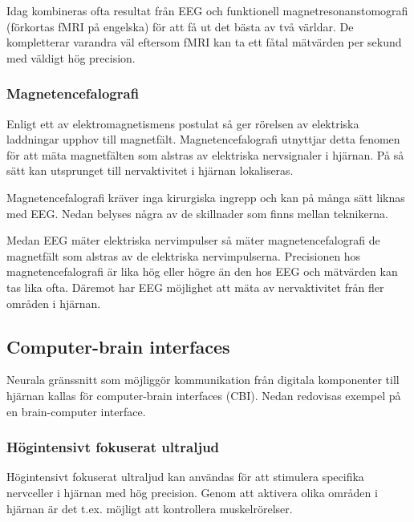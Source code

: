 \documentclass[12pt, a4paper]{article}
\begin{document}
Idag kombineras ofta resultat från EEG och funktionell magnetresonanstomografi
(förkortas fMRI på engelska) för att få ut det bästa av två världar. De
kompletterar varandra väl eftersom fMRI kan ta ett fåtal mätvärden per sekund
med väldigt hög precision. \cite{eeg_fmri}

\subsubsection{Magnetencefalografi}
\label{meg}

Enligt ett av elektromagnetismens postulat så ger rörelsen av elektriska
laddningar upphov till magnetfält. \cite{electromagnetism} Magnetencefalografi
utnyttjar detta fenomen för att mäta magnetfälten som alstras av elektriska
nervsignaler i hjärnan. På så sätt kan utsprunget till nervaktivitet i hjärnan
lokaliseras.

Magnetencefalografi kräver inga kirurgiska ingrepp och kan på många sätt liknas
med EEG. Nedan belyses några av de skillnader som finns mellan teknikerna.

Medan EEG mäter elektriska nervimpulser så mäter magnetencefalografi de
magnetfält som alstras av de elektriska nervimpulserna. Precisionen hos
magnetencefalografi är lika hög eller högre än den hos EEG och mätvärden kan tas
lika ofta. Däremot har EEG möjlighet att mäta av nervaktivitet från fler områden
i hjärnan. \cite{meg_eeg}

%
%

\subsection{Computer-brain interfaces}

Neurala gränssnitt som möjliggör kommunikation från digitala komponenter till
hjärnan kallas för computer-brain interfaces (CBI). Nedan redovisas exempel på
en brain-computer interface.

\subsubsection{Högintensivt fokuserat ultraljud}
Högintensivt fokuserat ultraljud kan användas för att stimulera specifika
nervceller i hjärnan med hög precision. Genom att aktivera olika områden i
hjärnan är det t.ex. möjligt att kontrollera muskelrörelser. \cite{bbi}
\end{document}

